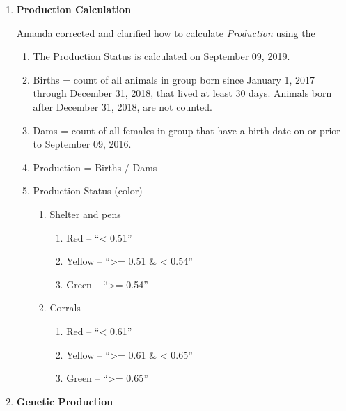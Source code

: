 \documentclass[
]{article}
\providecommand{\tightlist}{%
  \setlength{\itemsep}{0pt}\setlength{\parskip}{0pt}}
\begin{document}
\begin{enumerate}
\def\labelenumi{\arabic{enumi}.}
\item
  \textbf{Production Calculation}

  Amanda corrected and clarified how to calculate \emph{Production}
  using the

  \begin{enumerate}
  \def\labelenumii{\alph{enumii}.}
  \tightlist
  \item
    The Production Status is calculated on September 09, 2019.
  \item
    Births = count of all animals in group born since January 1, 2017
    through December 31, 2018, that lived at least 30 days. Animals born
    after December 31, 2018, are not counted.
  \item
    Dams = count of all females in group that have a birth date on or
    prior to September 09, 2016.
  \item
    Production = Births / Dams
  \item
    Production Status (color)

    \begin{enumerate}
    \def\labelenumiii{\arabic{enumiii}.}
    \tightlist
    \item
      Shelter and pens

      \begin{enumerate}
      \def\labelenumiv{\arabic{enumiv}.}
      \tightlist
      \item
        Red -- ``\textless{} 0.51''
      \item
        Yellow -- ``\textgreater= 0.51 \& \textless{} 0.54''
      \item
        Green -- ``\textgreater= 0.54''
      \end{enumerate}
    \item
      Corrals

      \begin{enumerate}
      \def\labelenumiv{\arabic{enumiv}.}
      \tightlist
      \item
        Red -- ``\textless{} 0.61''
      \item
        Yellow -- ``\textgreater= 0.61 \& \textless{} 0.65''
      \item
        Green -- ``\textgreater= 0.65''
      \end{enumerate}
    \end{enumerate}
  \end{enumerate}
\item
  \textbf{Genetic Production}


\end{enumerate}
\end{document}
